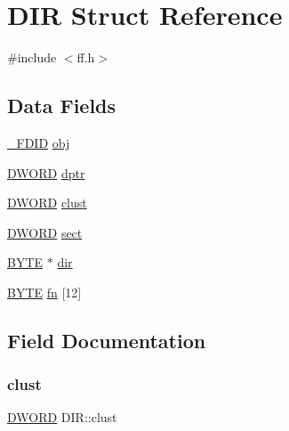 \hypertarget{struct_d_i_r}{}\section{D\+IR Struct Reference}
\label{struct_d_i_r}


{\ttfamily \#include $<$ff.\+h$>$}

\subsection*{Data Fields}
\begin{DoxyCompactItemize}
\item 
\mbox{\hyperlink{struct___f_d_i_d}{\+\_\+\+F\+D\+ID}} \mbox{\hyperlink{struct_d_i_r_a5a4848c51616bf4ad90518c211ca3bb3}{obj}}
\item 
\mbox{\hyperlink{integer_8h_ad342ac907eb044443153a22f964bf0af}{D\+W\+O\+RD}} \mbox{\hyperlink{struct_d_i_r_a0330e9554e1f38795debe4495156873e}{dptr}}
\item 
\mbox{\hyperlink{integer_8h_ad342ac907eb044443153a22f964bf0af}{D\+W\+O\+RD}} \mbox{\hyperlink{struct_d_i_r_acfbb8ba2d6e73b6f999ceffd1857c190}{clust}}
\item 
\mbox{\hyperlink{integer_8h_ad342ac907eb044443153a22f964bf0af}{D\+W\+O\+RD}} \mbox{\hyperlink{struct_d_i_r_ad01fcc812ed0dad11a593574336adc9e}{sect}}
\item 
\mbox{\hyperlink{lz4_8c_a4ae1dab0fb4b072a66584546209e7d58}{B\+Y\+TE}} $\ast$ \mbox{\hyperlink{struct_d_i_r_a6c2a8c0cf2d55ae99775e93a16593449}{dir}}
\item 
\mbox{\hyperlink{lz4_8c_a4ae1dab0fb4b072a66584546209e7d58}{B\+Y\+TE}} \mbox{\hyperlink{struct_d_i_r_ad90d974c0e7640307598c586bf141b32}{fn}} \mbox{[}12\mbox{]}
\end{DoxyCompactItemize}


\subsection{Field Documentation}
\mbox{\label{struct_d_i_r_acfbb8ba2d6e73b6f999ceffd1857c190}} 
\subsubsection{\texorpdfstring{clust}{clust}}
{\footnotesize\ttfamily \mbox{\hyperlink{integer_8h_ad342ac907eb044443153a22f964bf0af}{D\+W\+O\+RD}} D\+I\+R\+::clust}

